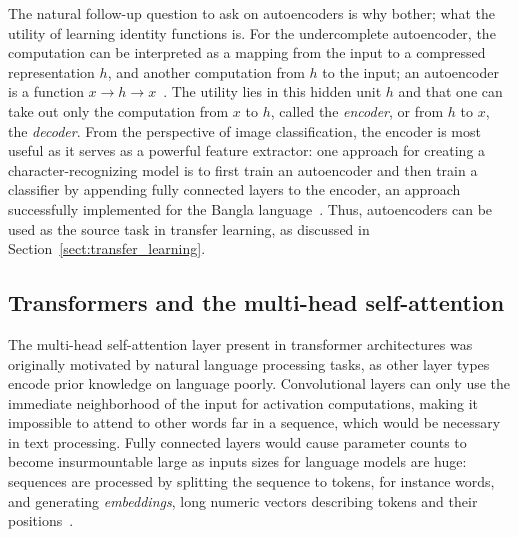 \documentclass[english,twoside,openright]{UH_DS_MSc}
\begin{document}
The natural follow-up question to ask on autoencoders is why bother; what the utility 
of learning identity functions is. For the undercomplete autoencoder, the computation 
can be interpreted as a mapping from the input to a compressed representation $h$, and 
another computation from $h$ to the input; an autoencoder is a function $x\to h\to x$~\cite{goodfellow}.
The utility lies in this hidden unit $h$ and that one can take out only the 
computation from $x$ to $h$, called the \textit{encoder}, or from $h$ to $x$, the \textit{decoder}.
From the perspective of image classification, the encoder is most useful as it serves 
as a powerful feature extractor: one approach for creating a character-recognizing model 
is to first train an autoencoder and then train a classifier by appending 
fully connected layers to the encoder, an approach successfully implemented for the Bangla language~\cite{6shoponBangla}.
Thus, autoencoders can be used as the source 
task in transfer learning, as discussed in Section~\ref{sect:transfer_learning}.

\subsection{Transformers and the multi-head self-attention}

The multi-head self-attention layer present in transformer architectures was
originally motivated by natural language processing tasks, as other layer types
encode prior knowledge on language poorly.
Convolutional layers can only use the immediate neighborhood of the input for activation computations, making it impossible to attend to other words far in a sequence, which would be necessary in text processing. Fully connected layers would cause parameter counts to become insurmountable large as inputs sizes for language models are huge: sequences are processed by splitting the sequence to tokens, for instance words, and generating \textit{embeddings}, long numeric vectors describing tokens and their positions~\cite{princebook}.
\end{document}
